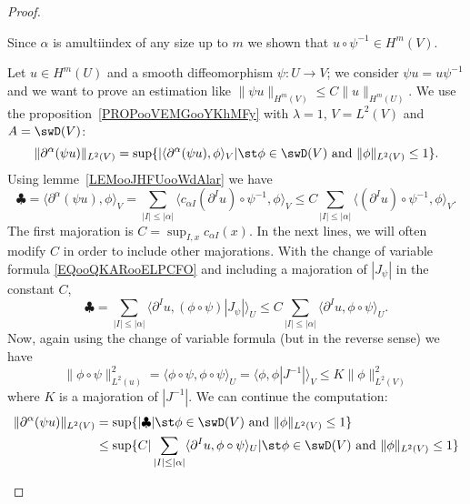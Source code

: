 \begin{proof}
\begin{subproof}
		Since \( \alpha\) is  amultiindex of any size up to \( m\) we shown that \( u\circ\psi^{-1}\in H^m(V)\).



		Let \( u\in H^m(U)\) and a smooth diffeomorphism \( \psi\colon U\to V\); we consider \( \psi u=u\psi^{-1}\) and we want to prove an estimation like \( \| \psi u \|_{H^m(V)}\leq C\| u \|_{H^m(U)}\). We use the proposition~\ref{PROPooVEMGooYKhMFy} with \( \lambda=1\), \( V=L^2(V)\) and \( A=\swD(V)\):
		\begin{equation}
			\| \partial^{\alpha}(\psi u) \|_{L^2(V)}=\sup\{ | \langle \partial^{\alpha}(\psi u), \phi\rangle_V |\st \phi\in\swD(V)\text{ and }\| \phi \|_{L^2(V)}\leq 1 \}.
		\end{equation}
		Using lemme~\ref{LEMooJHFUooWdAlar} we have
		\begin{equation}
			\clubsuit=\langle \partial^{\alpha}(\psi u), \phi\rangle_V=\sum_{| I |\leq | \alpha |}\langle c_{\alpha I}(\partial^Iu)\circ\psi^{-1}, \phi\rangle_V\leq C\sum_{| I |\leq | \alpha |}\langle (\partial^Iu)\circ \psi^{-1}, \phi\rangle_V.
		\end{equation}
		The first majoration is \( C=\sup_{I,x}c_{\alpha I}(x)\). In the next lines, we will often modify \( C\) in order to include other majorations. With the change of variable formula \eqref{EQooQKARooELPCFO} and including a majoration of \( | J_{\psi} |\) in the constant \( C\),
		\begin{equation}
			\clubsuit=\sum_{| I |\leq | \alpha |}\langle \partial^Iu, (\phi\circ\psi)| J_{\psi} |\rangle_U\leq C\sum_{| I |\leq | \alpha |}\langle \partial^Iu, \phi\circ\psi\rangle_U.
		\end{equation}
		Now, again using the change of variable formula (but in the reverse sense) we have
		\begin{equation}
			\| \phi\circ\psi \|^2_{L^2(u)}=\langle \phi\circ\psi, \phi\circ\psi\rangle_U=\langle \phi, \phi| J^{-1} |\rangle_V\leq K\| \phi \|^2_{L^2(V)}
		\end{equation}
		where \( K\) is a majoration of \( | J^{-1} |\). We can continue the computation:
		\begin{subequations}
			\begin{align}
				\| \partial^{\alpha}(\psi u) \|_{L^2(V)} & =\sup\{ | \clubsuit |\st \phi\in\swD(V)\text{ and }\| \phi \|_{L^2(V)}\leq 1 \}                                                                   \\
				                                         & \leq \sup\{ C|\sum_{| I |\leq | \alpha |}\langle \partial^Iu, \phi\circ\psi\rangle_U|\st \phi\in\swD(V)\text{ and }\| \phi \|_{L^2(V)}\leq 1 \}   \\

\end{align}
\end{subequations}
\end{subproof}
\end{proof}
